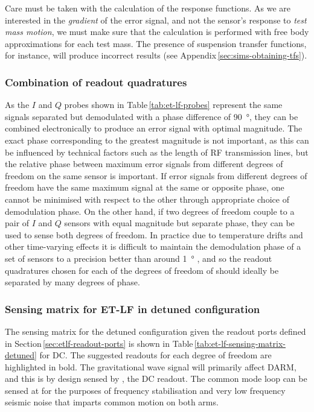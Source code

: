 Care must be taken with the calculation of the response functions. As we are interested in the \emph{gradient} of the error signal, and not the sensor's response to \emph{test mass motion}, we must make sure that the calculation is performed with free body approximations for each test mass. The presence of suspension transfer functions, for instance, will produce incorrect results (see Appendix\,\ref{sec:sims-obtaining-tfs}).

\subsubsection{Combination of readout quadratures}
As the $I$ and $Q$ probes shown in Table\,\ref{tab:et-lf-probes} represent the same signals separated but demodulated with a phase difference of \SI{90}{\degree}, they can be combined electronically to produce an error signal with optimal magnitude. The exact phase corresponding to the greatest magnitude is not important, as this can be influenced by technical factors such as the length of \gls{RF} transmission lines, but the relative phase between maximum error signals from different degrees of freedom on the same sensor is important. If error signals from different degrees of freedom have the same maximum signal at the same or opposite phase, one cannot be minimised with respect to the other through appropriate choice of demodulation phase. On the other hand, if two degrees of freedom couple to a pair of $I$ and $Q$ sensors with equal magnitude but separate phase, they can be used to sense both degrees of freedom. In practice due to temperature drifts and other time-varying effects it is difficult to maintain the demodulation phase of a set of sensors to a precision better than around \SI{1}{\degree} \cite{Effler2014}, and so the readout quadratures chosen for each of the degrees of freedom of \ETLF{} should ideally be separated by many degrees of phase.

\subsubsection{Sensing matrix for ET-LF in detuned configuration}
The sensing matrix for the detuned configuration given the readout ports defined in Section\,\ref{sec:etlf-readout-ports} is shown in Table\,\ref{tab:et-lf-sensing-matrix-detuned} for \gls{DC}. The suggested readouts for each degree of freedom are highlighted in bold. The gravitational wave signal will primarily affect \gls{DARM}, and this is by design sensed by \ASDC{}, the \gls{DC} readout. The common mode loop can be sensed at \REFLFIRST{} for the purposes of frequency stabilisation and very low frequency seismic noise that imparts common motion on both arms.

